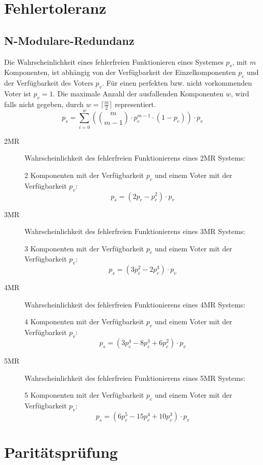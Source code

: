 \documentclass
[
	8pt,		%
	ngerman,	%
	a4paper,	%
	landscape,	%
	final		%
]{extarticle}
\begin{document}
\begin{multicols*}{4}
	\section{Fehlertoleranz}
	\subsection{N-Modulare-Redundanz}
	Die Wahrscheinlichkeit eines fehlerfreien Funktionieren eines Systemes
	\(p_{s}\), mit \(m\) Komponenten, ist abhängig von der Verfügbarkeit der
	Einzelkomponenten \(p_{c}\) und der Verfügbarkeit des Voters \(p_{v}\). Für
	einen perfekten bzw. nicht vorkommenden Voter ist \(p_{v} = 1\). Die
	maximale Anzahl der ausfallenden Komponenten \(w\), wird falls nicht gegeben,
	durch \(w = \lceil \frac{m}{2} \rceil\) representiert.
	\[p_{s} = \sum_{i = 0}^{w} \left( \binom{m}{m - 1} \cdot p_{c}^{m - 1} \cdot (1 - p_{c}) \right) \cdot p_{v}\]
	\begin{description}
		\item[2MR]
		      Wahrscheinlichkeit des fehlerfreien Funktionierens eines 2MR
		      Systems:\par 2 Komponenten mit der Verfügbarkeit \(p_{c}\) und
		      einem Voter mit der Verfügbarkeit \(p_{v}\):
		      \[p_{s} = \left(2 p_{c} - p_{c}^{2} \right) \cdot p_{v}\]
		\item[3MR]
		      Wahrscheinlichkeit des fehlerfreien Funktionierens eines 3MR
		      Systems:\par 3 Komponenten mit der Verfügbarkeit \(p_{c}\) und
		      einem Voter mit der Verfügbarkeit \(p_{v}\):
		      \[p_{s} = \left(3 p_{c}^{2} - 2 p_{c}^{3} \right) \cdot p_{v}\]
		\item[4MR]
		      Wahrscheinlichkeit des fehlerfreien Funktionierens eines 4MR
		      Systems:\par 4 Komponenten mit der Verfügbarkeit \(p_{c}\) und
		      einem Voter mit der Verfügbarkeit \(p_{v}\):
		      \[p_{s} = \left(3 p_{c}^{4} - 8 p_{c}^{3} + 6 p_{c}^{2} \right) \cdot p_{v}\]
		\item[5MR]
		      Wahrscheinlichkeit des fehlerfreien Funktionierens eines 5MR
		      Systems:\par 5 Komponenten mit der Verfügbarkeit \(p_{c}\) und
		      einem Voter mit der Verfügbarkeit \(p_{v}\):
		      \[p_{s} = \left(6 p_{c}^{5} - 15 p_{c}^{4} + 10 p_{c}^{3} \right) \cdot p_{v}\]
	\end{description}
	\section{Paritätsprüfung}

\end{multicols*}
\end{document}

